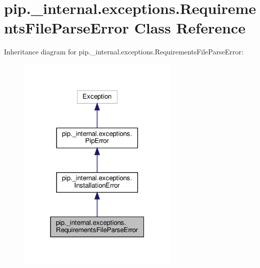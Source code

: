 \hypertarget{classpip_1_1__internal_1_1exceptions_1_1RequirementsFileParseError}{}\section{pip.\+\_\+internal.\+exceptions.\+Requirements\+File\+Parse\+Error Class Reference}
\label{classpip_1_1__internal_1_1exceptions_1_1RequirementsFileParseError}


Inheritance diagram for pip.\+\_\+internal.\+exceptions.\+Requirements\+File\+Parse\+Error\+:
\nopagebreak
\begin{figure}[H]
\begin{center}
\leavevmode
\includegraphics[width=220pt]{classpip_1_1__internal_1_1exceptions_1_1RequirementsFileParseError__inherit__graph}
\end{center}
\end{figure}



